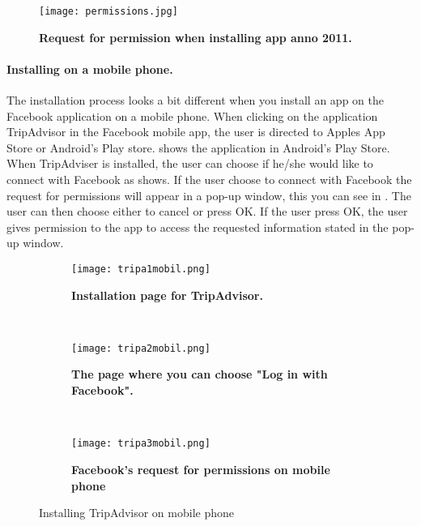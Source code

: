 \begin{figure}[t]
\centering
\texttt{[image: permissions.jpg]}
\caption[Request for permission when installing app anno 2011]{\textbf{Request for permission when installing app anno 2011.} } 
\label{fig:permissions2011}
\end{figure}

\paragraph{Installing on a mobile phone.}
The installation process looks a bit different when you install an app on the Facebook application on a mobile phone. When clicking on the application TripAdvisor in the Facebook mobile app, the user is directed to Apples App Store or Android's Play store.  shows the application in Android's Play Store. When TripAdviser is installed, the user can choose if he/she would like to connect with Facebook as  shows. If the user choose to connect with Facebook the request for permissions will appear in a pop-up window, this you can see in . The user can then choose either to cancel or press OK. If the user press OK, the user gives permission to the app to access the requested information stated in the pop-up window. 

\begin{figure}
        \centering
        \begin{subfigure}[t]{0.3\textwidth}
                \texttt{[image: tripa1mobil.png]}
                \caption[Installation page for TripAdvisor]{\textbf{Installation 				page for TripAdvisor.}} 
                \label{fig:tripa1mobil}
        \end{subfigure}%
        ~ %
        \begin{subfigure}[t]{0.3\textwidth}
                \texttt{[image: tripa2mobil.png]}
               \caption[The page where you choose "Log in with Facebook"]							{\textbf{The page where you can choose "Log in with Facebook".}} 
                \label{fig:tripa2mobil}
        \end{subfigure}
        ~ %
        \begin{subfigure}[t]{0.3\textwidth}
                \texttt{[image: tripa3mobil.png]}
                \caption[Facebook's request for permissions on mobile phone]						{\textbf{Facebook's request for permissions on mobile phone}} 
                \label{fig:tripa3mobil}
        \end{subfigure}
        \caption{Installing TripAdvisor on mobile phone}\label{fig:mobileinstallation}
\end{figure}

